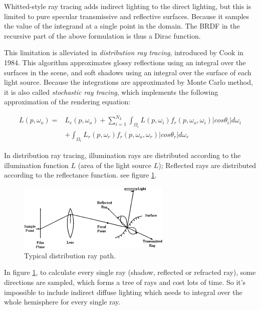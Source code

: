 Whitted-style ray tracing adds indirect lighting to the direct lighting, but this is limited to pure specular transmissive and reflective surfaces. Because it samples the value of the integrand at a single point in the domain. The BRDF in the recursive part of the above formulation is thus a Dirac function.

This limitation is alleviated in \textit{distribution ray tracing}, introduced by Cook \cite[-6mm]{a:DistributedRayTracing} in 1984. This algorithm approximates glossy reflections using an integral over the surfaces in the scene, and soft shadows using an integral over the surface of each light source. Because the integrations are approximated by Monte Carlo method, it is also called \textit{stochastic ray tracing}, which implements the following approximation of the rendering equation:

\begin{equation}
\begin{aligned}
	L(p,\omega_o)=&L_e(p, \omega_o)+\sum_{i=1}^{N_L}\int_{\Omega_i}L(p,\omega_i) f_r(p,\omega_o,\omega_i)|cos\theta_i|d\omega_i\\
	&+\int_{\Omega_r}L_r(p,\omega_r)f_r(p,\omega_o,\omega_r)|cos\theta_r|d\omega_r
\end{aligned}
\end{equation}

In distribution ray tracing, illumination rays are distributed according to the illumination function $L$ (area of the light source $L$); Reflected rays are distributed according to the reflectance function. see figure \ref{f:distribution-ray-tracing}. 

\begin{figure}\label{f:distribution-ray-tracing}
\sidecaption
	\includegraphics[width=0.65\textwidth]{graphics/gi/path-3}
	\caption{Typical distribution ray path.}
\end{figure}

In figure \ref{f:distribution-ray-tracing}, to calculate every single ray (shadow, reflected or refracted ray), some directions are sampled, which forms a tree of rays and cost lots of time. So it's impossible to include indirect diffuse lighting which needs to integral over the whole hemisphere for every single ray.


